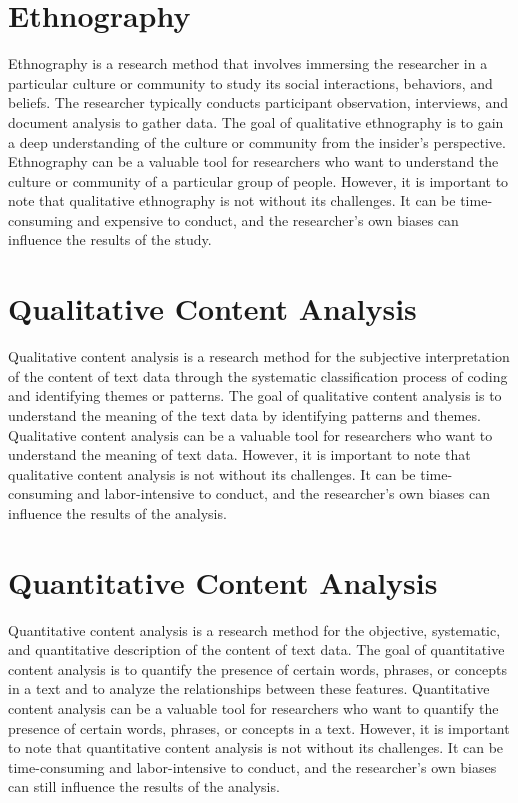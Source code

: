 \documentclass[
  b5paper]{book}
\begin{document}
\hypertarget{ethnography}{%
\section*{Ethnography}\label{ethnography}}

Ethnography is a research method that involves immersing the researcher in a particular culture or community to study its social interactions, behaviors, and beliefs. The researcher typically conducts participant observation, interviews, and document analysis to gather data. The goal of qualitative ethnography is to gain a deep understanding of the culture or community from the insider's perspective. Ethnography can be a valuable tool for researchers who want to understand the culture or community of a particular group of people. However, it is important to note that qualitative ethnography is not without its challenges. It can be time-consuming and expensive to conduct, and the researcher's own biases can influence the results of the study.

\hypertarget{qualitative-content-analysis}{%
\section*{Qualitative Content Analysis}\label{qualitative-content-analysis}}

Qualitative content analysis is a research method for the subjective interpretation of the content of text data through the systematic classification process of coding and identifying themes or patterns. The goal of qualitative content analysis is to understand the meaning of the text data by identifying patterns and themes. Qualitative content analysis can be a valuable tool for researchers who want to understand the meaning of text data. However, it is important to note that qualitative content analysis is not without its challenges. It can be time-consuming and labor-intensive to conduct, and the researcher's own biases can influence the results of the analysis.

\hypertarget{quantitative-content-analysis}{%
\section*{Quantitative Content Analysis}\label{quantitative-content-analysis}}

Quantitative content analysis is a research method for the objective, systematic, and quantitative description of the content of text data. The goal of quantitative content analysis is to quantify the presence of certain words, phrases, or concepts in a text and to analyze the relationships between these features. Quantitative content analysis can be a valuable tool for researchers who want to quantify the presence of certain words, phrases, or concepts in a text. However, it is important to note that quantitative content analysis is not without its challenges. It can be time-consuming and labor-intensive to conduct, and the researcher's own biases can still influence the results of the analysis.
\end{document}
